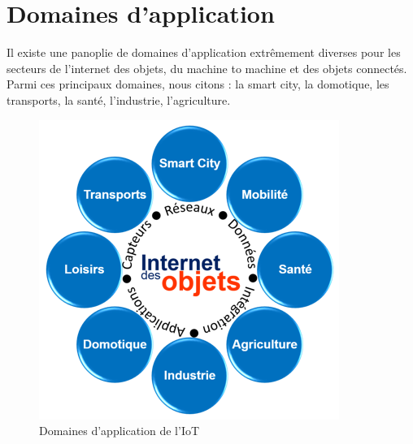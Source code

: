 \section{Domaines d’application}
Il existe une panoplie de domaines d’application extrêmement diverses pour les secteurs de l’internet des objets, du machine to machine et des objets connectés. Parmi ces principaux domaines, nous citons : la smart city, la domotique, les transports, la santé, l’industrie, l’agriculture.
\begin{figure}[H]
	\begin{center}
		\includegraphics{IMAGES/ORIGINALS/Application_IoT}
	\end{center}
	\caption{Domaines d'application de l'IoT}
\end{figure}

